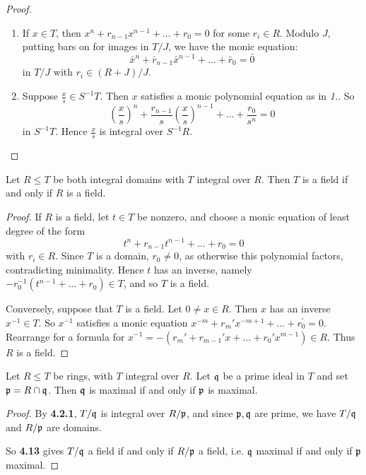 \documentclass[10pt,a4paper]{article}
\begin{document}
\begin{proof}\hspace*{0cm}
  \begin{enumerate}
    \item If $x \in T$, then $x^n + r_{n-1}x^{n-1}+\ldots+r_0 = 0$ for some $r_i \in R$. Modulo $J$, putting bars on for images in $T/J$, we have the monic equation:
    \[\bar{x}^n + \bar{r}_{n-1}\bar{x}^{n-1}+\ldots+\bar{r}_0=\bar{0}\]
    in $T/J$ with $r_i \in (R+J)/J$.

    \item Suppose $\frac{x}{s} \in S^{-1}T$. Then $x$ satisfies a monic polynomial equation as in \textit{1.}. So
    \[\left(\frac{x}{s}\right)^n +\frac{r_{n-1}}{s}\left(\frac{x}{s}\right)^{n-1}+\ldots+\frac{r_0}{s^n} = 0\]
    in $S^{-1}T$. Hence $\frac{x}{s}$ is integral over $S^{-1}R$.
  \end{enumerate}
\end{proof}
\begin{lemma}
  Let $R \leq T$ be both integral domains with $T$ integral over $R$. Then $T$ is a field if and only if $R$ is a field.
\end{lemma}
\begin{proof}
  If $R$ is a field, let $t \in T$ be nonzero, and choose a monic equation of least degree of the form
  \[t^n + r_{n-1}t^{n-1} + \ldots + r_0 = 0\]
  with $r_i \in R$. Since $T$ is a domain, $r_0 \neq 0$, as otherwise this polynomial factors, contradicting minimality. Hence $t$ has an inverse, namely $-r_0^{-1}(t^{n-1}+\ldots+r_0)\in T$, and so $T$ is a field.

  Conversely, suppose that $T$ is a field. Let $0 \neq x \in R$. Then $x$ has an inverse $x^{-1} \in T$. So $x^{-1}$ satisfies a monic equation $x^{-m} + r_m'x^{-m+1} + \ldots +  r_0^' = 0$. Rearrange for a formula for $x^{-1} = -(r_m' + r_{m-1}'x+\ldots+r_0'x^{m-1})\in R$. Thus $R$ is a field.
\end{proof}
\begin{lemma}
  Let $R \leq T$ be rings, with $T$ integral over $R$. Let $\mathfrak{q}$ be a prime ideal in $T$ and set $\mathfrak{p} = R \cap \mathfrak{q}$. Then $\mathfrak{q}$ is maximal if and only if $\mathfrak{p}$ is maximal.
\end{lemma}
\begin{proof}
  By \textbf{4.2.1}, $T/\mathfrak{q}$ is integral over $R/\mathfrak{p}$, and since $\mathfrak{p}, \mathfrak{q}$ are prime, we have $T/\mathfrak{q}$ and $R/\mathfrak{p}$ are domains.

  So \textbf{4.13} gives $T/\mathfrak{q}$ a field if and only if $R/\mathfrak{p}$ a field, i.e. $\mathfrak{q}$ maximal if and only if $\mathfrak{p}$ maximal.
\end{proof}
\end{document}

